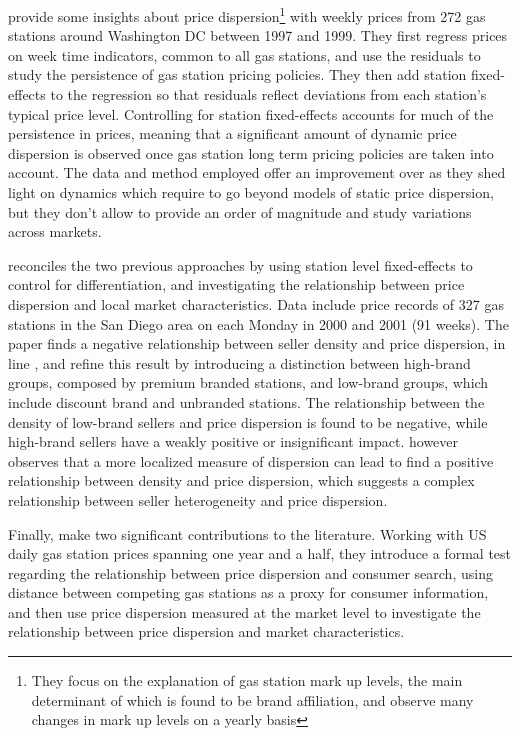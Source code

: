 \documentclass[english]{article}
\begin{document}
\cite{HOS08} provide some insights about price dispersion\footnote{They focus on the explanation of gas station mark up levels, the main determinant of which is found to be brand affiliation, and observe many changes in mark up levels  on a yearly basis} with weekly prices from 272 gas stations around Washington DC  between 1997 and 1999. They first regress prices on week time indicators, common to all gas stations, and use the residuals to study the persistence of gas station pricing policies. They then add station fixed-effects to the regression so that residuals reflect deviations from each station's typical price level. Controlling for station fixed-effects accounts for much of the persistence in prices, meaning that a significant amount of dynamic price dispersion is observed once gas station long term pricing policies are taken into account.  The data and method employed offer an improvement over \cite{BAR04} as they shed light on dynamics which require to go beyond models of static price dispersion, but they don't allow to provide an order of magnitude and study variations across markets.

\cite{LEW08} reconciles the two previous approaches by using station level fixed-effects to control for differentiation, and investigating the relationship between price dispersion and local market characteristics. Data include price records of 327 gas stations in the San Diego area on each Monday in 2000 and 2001 (91 weeks). The paper finds a negative relationship between seller density and price dispersion, in line \cite{BAR04}, and refine this result by introducing a distinction between high-brand groups, composed by premium branded stations, and low-brand groups, which include discount brand and unbranded stations. The relationship between the density of low-brand sellers and price dispersion is found to be negative, while high-brand sellers have a weakly positive or insignificant impact. \cite{LEW08} however observes that a more localized measure of dispersion can lead to find a positive relationship between density and price dispersion, which suggests a complex relationship between seller heterogeneity and price dispersion.

Finally, \cite{TAP11} make two significant contributions to the literature. Working with US daily gas station prices spanning one year and a half, they introduce a formal test regarding the relationship between price dispersion and consumer search, using distance between competing gas stations as a proxy for consumer information, and then use price dispersion measured at the market level to investigate the relationship between price dispersion and market characteristics.
\end{document}
